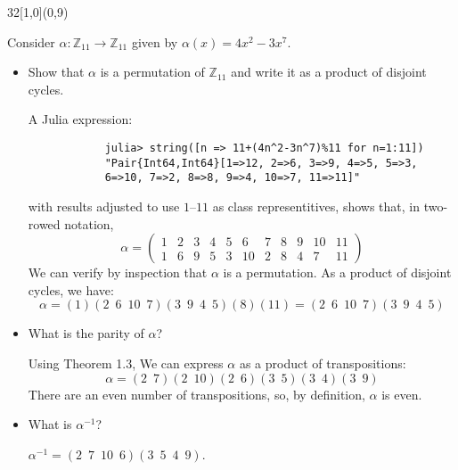 \documentclass[12pt]{article}
\newcommand{\zee}{\mathbb{Z}}
\newenvironment{exercise}[2]{\begin{textblock}{32}[1,0](0,#2)\noindent#1\end{textblock}}{\vspace{1in}}
\begin{document}
\begin{exercise}{1.29}{9} %
	{\noindent}Consider $\alpha: \zee_{11}\to \zee_{11}$ given by $\alpha(x)=4x^2-3x^7$.
	\begin{itemize}
		\item Show that $\alpha$ is a permutation of $\zee_{11}$ and write it as a product of disjoint cycles.
		\bigskip

		A Julia expression:
		\begin{verbatim}
			julia> string([n => 11+(4n^2-3n^7)%11 for n=1:11])
			"Pair{Int64,Int64}[1=>12, 2=>6, 3=>9, 4=>5, 5=>3,
			6=>10, 7=>2, 8=>8, 9=>4, 10=>7, 11=>11]"
		\end{verbatim}
		with results adjusted to use $1$--$11$ as class representitives, shows that, in two-rowed notation,
		\[
		\alpha = \left(
			\begin{array}{rrrrrrrrrrr}
		    1 &  2 &  3 &  4 &  5 &  6 &  7 &  8 &  9 & 10 & 11 \\
		    1 &  6 &  9 &  5 &  3 & 10 &  2 &  8 &  4 &  7 & 11
		  \end{array}
			\right)
		\]
		We can verify by inspection that $\alpha$ is a permutation. As a product of disjoint cycles, we have:
		\[ \alpha = (1)(2\enspace6\enspace10\enspace7)(3\enspace9\enspace4\enspace5)(8)(11) = (2\enspace6\enspace10\enspace7)(3\enspace9\enspace4\enspace5) \]

		\item What is the parity of $\alpha$?
		\bigskip

		Using Theorem 1.3, We can express $\alpha$ as a product of transpositions:
		\[ \alpha = (2\enspace7)(2\enspace10)(2\enspace6)(3\enspace5)(3\enspace4)(3\enspace9) \]
		There are an even number of transpositions, so, by definition, $\alpha$ is even.

		\item What is $\alpha^{-1}$?
		\bigskip

		$\alpha^{-1}=(2\enspace7\enspace10\enspace6)(3\enspace5\enspace4\enspace9)$.
	\end{itemize}
\end{exercise}

\newpage
\end{document}
